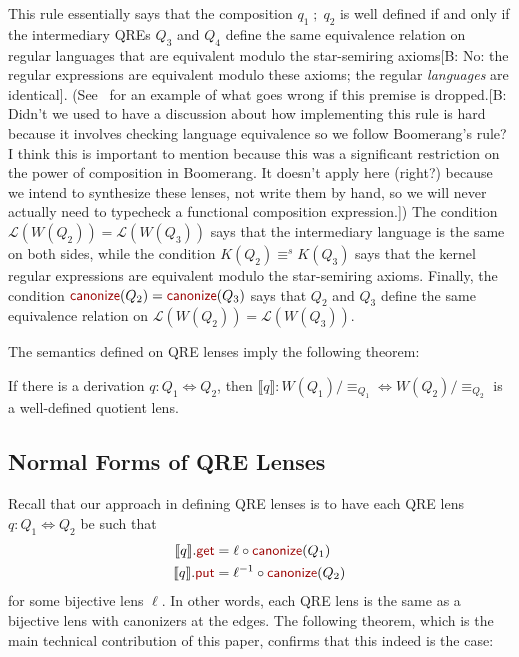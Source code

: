 \documentclass[acmsmall,review,anonymous]{acmart}
\newcommand{\FINISH}[3]{\ifdraft\textcolor{#1}{[#2: #3]}\fi}
\newcommand{\bcp}[1]{\FINISH{dkred}{B}{#1}}
\newcommand{\kw}[1]{\textcolor{dkred}{\ensuremath{\mathsf{#1}}}}
\newcommand{\eqrel}[1]{\ensuremath{\equiv_{#1}}}
\newcommand{\canonize}{\ensuremath{\kw{canonize}}}
\newcommand{\get}{\ensuremath{\kw{get}}}
\newcommand{\lput}{\ensuremath{\kw{put}}}
\begin{document}
This rule essentially says that the composition $q_1 \; ; \; q_2$ is
well defined if and only if the intermediary QREs $Q_3$ and $Q_4$ define the
same equivalence relation on regular languages that are equivalent modulo the
star-semiring axioms\bcp{No: the regular expressions are equivalent modulo
  these axioms; the regular {\em languages} are
  identical}. (See~\cite[\S 4]{quotientlenses} for an example of what goes
wrong if this premise is dropped.\bcp{Didn't we used to have a discussion
  about how implementing this rule is hard because it involves checking
  language equivalence so we follow Boomerang's rule?  I think this is
  important to mention because this was a significant restriction on the
  power of composition in Boomerang.  It doesn't apply here (right?) because
we intend to synthesize these lenses, not write them by hand, so we will
never actually need to typecheck a functional composition expression.}) The
condition $\mathcal{L}(W(Q_2)) = \mathcal{L}(W(Q_3))$ 
says that the intermediary language is the same on both sides, while the
condition $K(Q_2) \equiv^s K(Q_3)$ says that the kernel regular expressions are
equivalent modulo the star-semiring axioms. Finally, the condition
$\canonize(Q_2) = \canonize(Q_3)$ says that $Q_2$ and $Q_3$ define the same
equivalence relation on $\mathcal{L}(W(Q_2))= \mathcal{L}(W(Q_3))$.

The semantics defined on QRE lenses imply the following theorem:
\begin{theorem}
If there is a derivation $q : Q_1 \Leftrightarrow Q_2$, then $\llbracket q
\rrbracket : W(Q_1)/{\eqrel{Q_1}} \Leftrightarrow W(Q_2)/{\eqrel{Q_2}}$ is a
well-defined quotient lens.
\end{theorem}
\subsection{Normal Forms of QRE Lenses}
Recall that our approach in defining QRE lenses is to have each QRE lens $q: Q_1
\Leftrightarrow Q_2$ be such that
\begin{align*}
\llbracket q \rrbracket.\get &= \ell \circ \canonize(Q_1)\\
\llbracket q \rrbracket.\lput &= \ell^{-1} \circ \canonize(Q_2)
\end{align*}
for some bijective lens $\ell$. In other words, each QRE lens is the same as a
bijective lens with canonizers at the edges. The following theorem,
which is the main technical contribution of this paper, confirms that this
indeed is the case:
\end{document}
